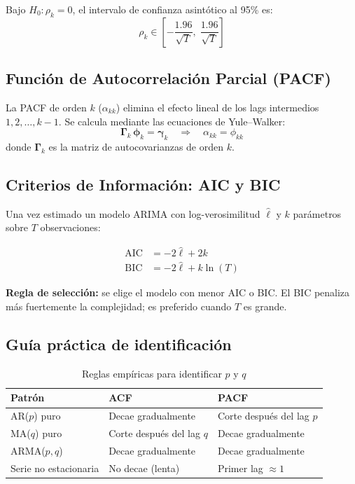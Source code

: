\documentclass[12pt,a4paper]{article}
\begin{document}
Bajo $H_0: \rho_k = 0$, el intervalo de confianza asint{\'o}tico al 95\% es:
\[
  \rho_k \in \left[-\frac{1.96}{\sqrt{T}},\; \frac{1.96}{\sqrt{T}}\right]
\]

\subsection{Funci{\'o}n de Autocorrelaci{\'o}n Parcial (PACF)}

La PACF de orden $k$ ($\alpha_{kk}$) elimina el efecto lineal de los lags intermedios
$1,2,\ldots,k-1$. Se calcula mediante las ecuaciones de Yule--Walker:
\[
  \boldsymbol{\Gamma}_k \,\boldsymbol{\phi}_k = \boldsymbol{\gamma}_k
  \quad\Rightarrow\quad
  \alpha_{kk} = \phi_{kk}
\]
donde $\boldsymbol{\Gamma}_k$ es la matriz de autocovarianzas de orden $k$.

\subsection{Criterios de Informaci{\'o}n: AIC y BIC}

Una vez estimado un modelo ARIMA con log-verosimilitud $\hat{\ell}$ y $k$ par{\'a}metros
sobre $T$ observaciones:

\begin{align}
  \text{AIC} &= -2\hat{\ell} + 2k \label{eq:aic}\\[4pt]
  \text{BIC} &= -2\hat{\ell} + k\ln(T) \label{eq:bic}
\end{align}

\textbf{Regla de selecci{\'o}n:} se elige el modelo con menor AIC o BIC.
El BIC penaliza m{\'a}s fuertemente la complejidad; es preferido cuando $T$ es grande.

\subsection{Gu{\'i}a pr{\'a}ctica de identificaci{\'o}n}

\begin{table}[H]
  \centering
  \caption{Reglas emp{\'i}ricas para identificar $p$ y $q$}
  \label{tab:reglas}
  \begin{tabular}{lll}
    \toprule
    \textbf{Patr{\'o}n} & \textbf{ACF} & \textbf{PACF}\\
    \midrule
    AR($p$) puro      & Decae gradualmente  & Corte despu{\'e}s del lag $p$\\
    MA($q$) puro      & Corte despu{\'e}s del lag $q$ & Decae gradualmente\\
    ARMA($p,q$)       & Decae gradualmente  & Decae gradualmente\\
    Serie no estacionaria & No decae (lenta) & Primer lag $\approx 1$\\
    \bottomrule
  \end{tabular}
\end{table}
\end{document}
